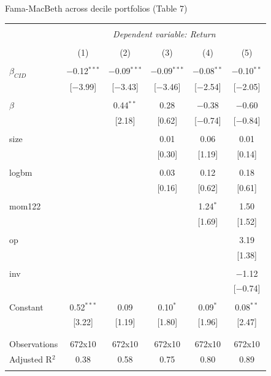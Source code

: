 \documentclass{beamer}
\begin{document}
\scriptsize
{\renewcommand{\arraystretch}{0.70}
\begin{frame}{Fama-MacBeth across decile portfolios (Table 7)}
\vspace{-0.4cm}
\begin{table}[!htbp] \centering 
\begin{tabular}{@{\extracolsep{5pt}}lccccc} 
\\[-1.8ex]\hline 
\hline \\[-1.8ex] 
 & \multicolumn{5}{c}{\textit{Dependent variable: Return}} \\ 
\cline{2-6} 
\\[-1.8ex] & (1) & (2) & (3) & (4) & (5)\\ 
\hline \\[-1ex] 
 $\beta_{CID}$ & $-$0.12$^{***}$ & $-$0.09$^{***}$ & $-$0.09$^{***}$ & $-$0.08$^{**}$ & $-$0.10$^{**}$ \\ 
  & [$-$3.99] & [$-$3.43] & [$-$3.46] & [$-$2.54] & [$-$2.05] \\ 
  & & & & & \\ 
 $\beta$ &  & 0.44$^{**}$ & 0.28 & $-$0.38 & $-$0.60 \\ 
  &  & [2.18] & [0.62] & [$-$0.74] & [$-$0.84] \\ 
  & & & & & \\ 
 size &  &  & 0.01 & 0.06 & 0.01 \\ 
  &  &  & [0.30] & [1.19] & [0.14] \\ 
  & & & & & \\ 
 logbm &  &  & 0.03 & 0.12 & 0.18 \\ 
  &  &  & [0.16] & [0.62] & [0.61] \\ 
  & & & & & \\ 
 mom122 &  &  &  & 1.24$^{*}$ & 1.50 \\ 
  &  &  &  & [1.69] & [1.52] \\ 
  & & & & & \\ 
 op &  &  &  &  & 3.19 \\ 
  &  &  &  &  & [1.38] \\ 
  & & & & & \\ 
 inv &  &  &  &  & $-$1.12 \\ 
  &  &  &  &  & [$-$0.74] \\ 
  & & & & & \\ 
 Constant & 0.52$^{***}$ & 0.09 & 0.10$^{*}$ & 0.09$^{*}$ & 0.08$^{**}$ \\ 
  & [3.22] & [1.19] & [1.80] & [1.96] & [2.47] \\ 
  & & & & & \\ 
\hline \\[-1.8ex] 
Observations & 672x10 & 672x10 & 672x10 & 672x10 & 672x10 \\
Adjusted R$^{2}$ & 0.38 & 0.58 & 0.75 & 0.80 & 0.89 \\ 
\hline 
\hline \\[-1.8ex] 
\end{tabular}
\end{table}
\end{frame}
}
\end{document}
